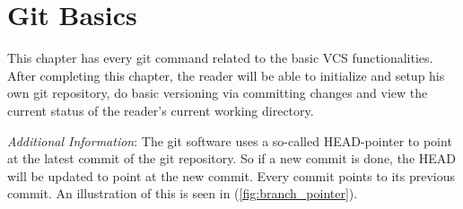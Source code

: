 \chapter{Git Basics}
\label{cha:git_basics}
This chapter has every git command related to the basic VCS functionalities. After completing this chapter, the reader will be able to initialize and setup his own git repository, do basic versioning via committing changes and view the current status of the reader's current working directory.

\textit{Additional Information}: The git software uses a so-called \dq{}HEAD\dq{}-pointer to point at the latest commit of the git repository. So if a new commit is done, the HEAD will be updated to point at the new commit. Every commit points to its previous commit. An illustration of this is seen in (\ref{fig:branch_pointer}).

\newpage




\newpage




\newpage




\newpage




\newpage


